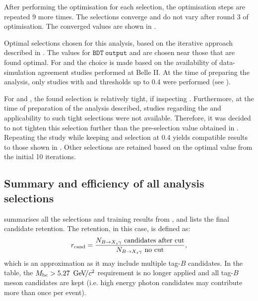 After performing the optimisation for each selection, the optimisation steps are repeated 9 more times.
The selections converge and do not vary after round 3 of optimisation.
The converged values are shown in .

\begin{table}[htbp!]
    \centering
    \caption{\label{tab:interative_optimisation} Optimal selections chosen for this analysis, based on the iterative approach described in .
    The values for $\mathtt{BDT~output}$ and \ZMVA are chosen near those that are found optimal.
    For \piVeto and \etaVeto the choice is made based on the availability of data-simulation agreement studies performed at Belle II.
    At the time of preparing the analysis, 
    only studies with \piVeto and \etaVeto thresholds 
    up to 0.4 were performed (see ).
    }
    
\end{table}

For \piVeto and \etaVeto, the found selection is relatively tight, if inspecting .
Furthermore, at the time of preparation of the analysis described, studies regarding the \piVeto and \etaVeto applicability to such tight selections were not available.
Therefore, it was decided to not tighten this selection further than the pre-selection value obtained in .
Repeating the study while keeping \piVeto and \etaVeto selection at 0.4 yields compatible results to those shown in .
Other selections are retained based on the optimal value from the initial 10 iterations.

\subsection{Summary and efficiency of all analysis selections}\label{sec:selection_summary}

 summarises all the selections and \BDT training results from ,
and lists the final \BtoXsgamma candidate retention.
The retention, in this case, is defined as:
\begin{equation}\label{eq:loose_efficiency}
    r_{\mathrm{cand}} = \frac{N_{\BtoXsgamma}~\mathrm{candidates~after~cut}}{N_{\BtoXsgamma}~\mathrm{no~cut}},
\end{equation}
which is an approximation as it may include multiple tag-$B$ candidates.
In the table, the ${M_{\mathrm{bc}}}>5.27~{\mathrm{\,Ge\kern -0.1em V\!/}c^2}$ requirement is no longer applied and all tag-$B$ meson candidates are kept (i.e. high energy photon candidates may contribute more than once per event).


